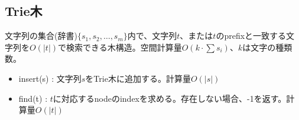 \subsection{Trie木}

文字列の集合(辞書)$\{s_1, s_2, \ldots, s_m \}$内で、文字列$t$、または$t$のprefixと一致する文字列を$O(|t|)$で検索できる木構造。空間計算量$O(k \cdot \sum{s_i})$、$k$は文字の種類数。

\begin{itemize}
    \item insert(s) : 文字列$s$をTrie木に追加する。計算量$O(|s|)$
    \item find(t) : $t$に対応するnodeのindexを求める。存在しない場合、-1を返す。計算量$O(|t|)$
\end{itemize}

